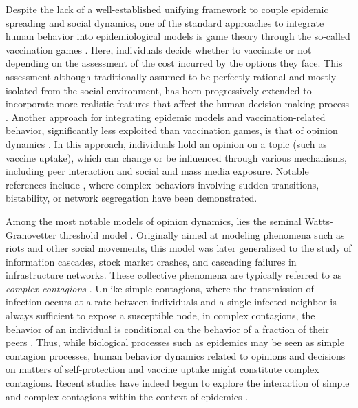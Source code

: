 \documentclass[
 reprint,
 amsmath,amssymb,
 aps,
]{revtex4-2}
\begin{document}
Despite the lack of a well-established unifying framework to couple epidemic spreading and social dynamics, one of the standard approaches to integrate human behavior into epidemiological models is game theory through the so-called vaccination games \cite{chang2020game, tanimoto2021sociophysics}. Here, individuals decide whether to vaccinate or not depending on the assessment of the cost incurred by the options they face. This assessment although traditionally assumed to be perfectly rational and mostly isolated from the social environment, has been progressively extended to incorporate more realistic features that affect the human decision-making process \cite{wang2015coupled, iwamura2018realistic, chang2020game, tanimoto2021sociophysics}. Another approach for integrating epidemic models and vaccination-related behavior, significantly less exploited than vaccination games, is that of opinion dynamics \cite{castellano2009statistical}. In this approach, individuals hold an opinion on a topic (such as vaccine uptake), which can change or be influenced through various mechanisms, including peer interaction and social and mass media exposure. Notable references include \cite{ni2011modeling, alvarez2017epidemic, pires2017dynamics, pires2018sudden, pires2021antivax, fugenschuh2022overcoming, teslya2022effect}, where complex behaviors involving sudden transitions, bistability, or network segregation have been demonstrated.

Among the most notable models of opinion dynamics, lies the seminal Watts-Granovetter threshold model \cite{granovetter1978threshold, watts2002simple, watts2007influentials}. Originally aimed at modeling phenomena such as riots and other social movements, this model was later generalized to the study of information cascades, stock market crashes, and cascading failures in infrastructure networks. These collective phenomena are typically referred to as \textit{complex contagions} \cite{centola2007complex}. Unlike simple contagions, where the transmission of infection occurs at a rate between individuals and a single infected neighbor is always sufficient to expose a susceptible node, in complex contagions, the behavior of an individual is conditional on the behavior of a fraction of their peers \cite{centola2007complex, min2018competing, cencetti2023distinguishing}. Thus, while biological processes such as epidemics may be seen as simple contagion processes, human behavior dynamics related to opinions and decisions on matters of self-protection and vaccine uptake might constitute complex contagions. Recent studies have indeed begun to explore the interaction of simple and complex contagions within the context of epidemics \cite{salathe2008effect, salathe2011assessing, campbell2013complex, fu2017dueling, centola2020complex, hebert2020spread, fugenschuh2022overcoming, qiu2022understanding}.
\end{document}
